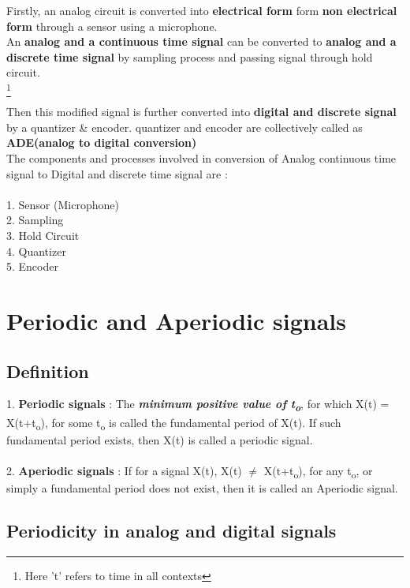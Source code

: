 \documentclass{article}
\begin{document}
Firstly, an analog circuit is converted into \textbf{electrical form} form \textbf{non electrical form} through a sensor using a microphone.\\

An \textbf{analog and a continuous time signal} can be converted to \textbf{analog and a discrete time signal} by sampling process and passing signal through hold circuit.\\
\footnote{Here 't' refers to time in all contexts}
\newpage

Then this modified signal is further converted into \textbf{digital and discrete signal} by a quantizer \& encoder. quantizer and encoder are collectively called as \textbf{ADE(analog to digital conversion)}\\


The components and processes involved in conversion of Analog continuous time signal to Digital and discrete time signal are :\\\\
1. Sensor (Microphone)\\
2. Sampling\\
3. Hold Circuit\\
4. Quantizer\\
5. Encoder\\


\section{Periodic and Aperiodic signals}
\subsection{Definition}

1. \textbf{Periodic signals} : The \textbf{\textit{minimum positive value of t\textsubscript{o}}}, for which X(t) = X(t+t\textsubscript{o}), for some t\textsubscript{o} is called the fundamental period of X(t). If such fundamental period exists, then X(t) is called a periodic signal.\\\\
2. \textbf{Aperiodic signals} : If for a signal X(t), X(t) $\neq$ X(t+t\textsubscript{o}), for any t\textsubscript{o}, or simply a fundamental period does not exist, then it is called an Aperiodic signal.

\subsection{Periodicity in analog and digital signals}
\end{document}
